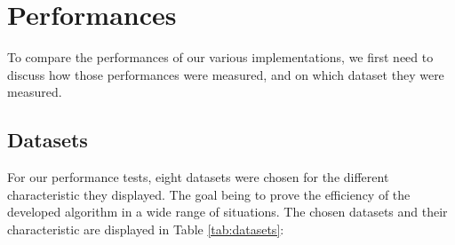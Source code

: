 \documentclass{eplmastersthesis}
\begin{document}
\newpage
{}
\section{Performances}

To compare the performances of our various implementations, we first need to discuss how those performances were measured, and on which dataset they were measured.

\subsection{Datasets}

For our performance tests, eight datasets were chosen for the different characteristic they displayed. The goal being to prove the efficiency of the developed algorithm in a wide range of situations. The chosen datasets and their characteristic are displayed in Table \ref{tab:datasets}: \newline
\end{document}

